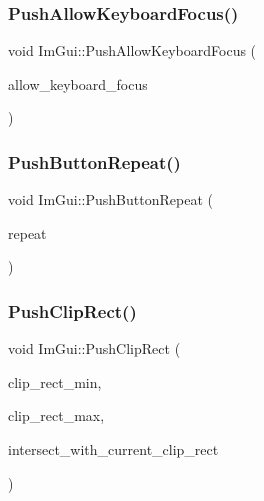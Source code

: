 \subsubsection{\texorpdfstring{Push\+Allow\+Keyboard\+Focus()}{PushAllowKeyboardFocus()}}
{\footnotesize\ttfamily void Im\+Gui\+::\+Push\+Allow\+Keyboard\+Focus (\begin{DoxyParamCaption}\item[{bool}]{allow\+\_\+keyboard\+\_\+focus }\end{DoxyParamCaption})}

\hypertarget{namespace_im_gui_a61d3e0191d67bedaf45f0178f87e3125}{}\label{namespace_im_gui_a61d3e0191d67bedaf45f0178f87e3125} 
\subsubsection{\texorpdfstring{Push\+Button\+Repeat()}{PushButtonRepeat()}}
{\footnotesize\ttfamily void Im\+Gui\+::\+Push\+Button\+Repeat (\begin{DoxyParamCaption}\item[{bool}]{repeat }\end{DoxyParamCaption})}

\hypertarget{namespace_im_gui_a11c8bd8676e1281e15b24c9615b6904a}{}\label{namespace_im_gui_a11c8bd8676e1281e15b24c9615b6904a} 
\subsubsection{\texorpdfstring{Push\+Clip\+Rect()}{PushClipRect()}}
{\footnotesize\ttfamily void Im\+Gui\+::\+Push\+Clip\+Rect (\begin{DoxyParamCaption}\item[{const \hyperlink{struct_im_vec2}{Im\+Vec2} \&}]{clip\+\_\+rect\+\_\+min,  }\item[{const \hyperlink{struct_im_vec2}{Im\+Vec2} \&}]{clip\+\_\+rect\+\_\+max,  }\item[{bool}]{intersect\+\_\+with\+\_\+current\+\_\+clip\+\_\+rect }\end{DoxyParamCaption})}

\hypertarget{namespace_im_gui_abb20c9f8365cab62d9394ebb1dd5d769}{}\label{namespace_im_gui_abb20c9f8365cab62d9394ebb1dd5d769} 
